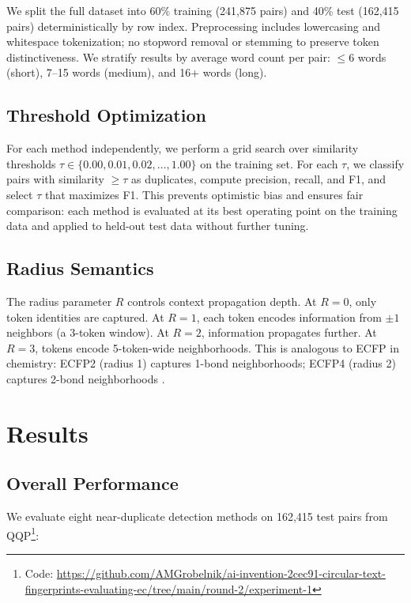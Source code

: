 \documentclass[11pt,letterpaper]{article}
\begin{document}
We split the full dataset into 60\% training (241,875 pairs) and 40\% test (162,415 pairs) deterministically by row index. Preprocessing includes lowercasing and whitespace tokenization; no stopword removal or stemming to preserve token distinctiveness. We stratify results by average word count per pair: ${\leq}6$ words (short), 7--15 words (medium), and 16+ words (long).

\subsection{Threshold Optimization}

For each method independently, we perform a grid search over similarity thresholds $\tau \in \{0.00, 0.01, 0.02, \ldots, 1.00\}$ on the training set. For each $\tau$, we classify pairs with similarity $\geq \tau$ as duplicates, compute precision, recall, and F1, and select $\tau$ that maximizes F1. This prevents optimistic bias and ensures fair comparison: each method is evaluated at its best operating point on the training data and applied to held-out test data without further tuning.

\subsection{Radius Semantics}

The radius parameter $R$ controls context propagation depth. At $R=0$, only token identities are captured. At $R=1$, each token encodes information from $\pm 1$ neighbors (a 3-token window). At $R=2$, information propagates further. At $R=3$, tokens encode 5-token-wide neighborhoods. This is analogous to ECFP in chemistry: ECFP2 (radius 1) captures 1-bond neighborhoods; ECFP4 (radius 2) captures 2-bond neighborhoods \citep{Rogers2010}.

\section{Results}

\subsection{Overall Performance}

We evaluate eight near-duplicate detection methods on 162,415 test pairs from QQP\footnote{Code: \url{https://github.com/AMGrobelnik/ai-invention-2cec91-circular-text-fingerprints-evaluating-ec/tree/main/round-2/experiment-1}}:
\end{document}
